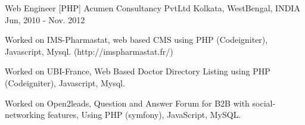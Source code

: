 \begin{cventries}
  \cventry
    {Web Engineer  [PHP]} %
    {Acumen Consultancy PvtLtd} %
    {Kolkata, WestBengal,  INDIA} %
    {Jun, 2010 - Nov. 2012} %
    {
      \begin{cvitems} %
        \item {Worked on IMS-Pharmastat, web based CMS using PHP (Codeigniter), Javascript, Mysql. (http://imspharmastat.fr/)}
        \item {Worked on UBI-France, Web Based Doctor Directory Listing using PHP (Codeigniter), Javascript, Mysql.}
        \item {Worked on Open2leads, Question and Answer Forum for B2B with social-networking features, Using  PHP (symfony), JavaScript, MySQL.}
      \end{cvitems}
    }
\end{cventries}
\clearpage
